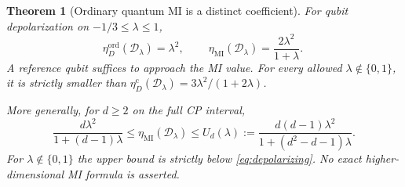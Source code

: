 \documentclass[11pt]{article}
\numberwithin{equation}{section}
\newtheorem{theorem}{Theorem}[section]
\theoremstyle{definition}
\theoremstyle{remark}
\newcommand{\D}{\mathcal D}
\newcommand{\etaC}{\eta_D^{\mathrm c}}
\newcommand{\etaMI}{\eta_{\mathrm{MI}}}
\newcommand{\etaOrd}{\eta_D^{\mathrm{ord}}}
\begin{document}
\begin{theorem}[Ordinary quantum MI is a distinct coefficient]
\label{thm:qubit-mi}
For qubit depolarization on $-1/3\leq\lambda\leq1$,
\begin{equation}
 \etaOrd(\D_\lambda)=\lambda^2,\qquad
 \boxed{\ \etaMI(\D_\lambda)=\frac{2\lambda^2}{1+\lambda}.\ }
 \label{eq:qubit-mi}
\end{equation}
A reference qubit suffices to approach the MI value. For every allowed
$\lambda\notin\{0,1\}$, it is strictly smaller than
$\etaC(\D_\lambda)=3\lambda^2/(1+2\lambda)$.

More generally, for $d\geq2$ on the full CP interval,
\begin{equation}
 \frac{d\lambda^2}{1+(d-1)\lambda}
 \leq\etaMI(\D_\lambda)
 \leq U_d(\lambda):=
 \frac{d(d-1)\lambda^2}{1+(d^2-d-1)\lambda}.
 \label{eq:higher-mi}
\end{equation}
For $\lambda\notin\{0,1\}$ the upper bound is strictly below
\eqref{eq:depolarizing}. No exact higher-dimensional MI formula is
asserted.
\end{theorem}
\end{document}
